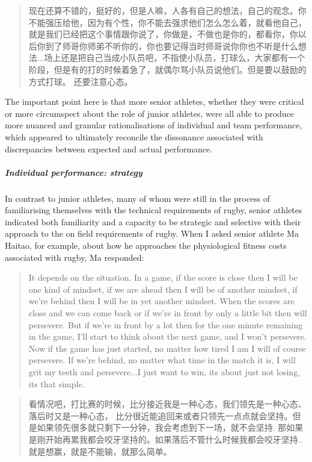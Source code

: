 \begin{CJK}{UTF8}{gbsn}
\begin{quotation}
  	现在还算不错的，挺好的，但是人嘛，人各有自己的想法，自己的观念。你不能强压给他，因为有个性，你不能去强求他们怎么怎么着，就看他自己，就是我们已经把这个事情跟你说了，你做是，不做也是你的，都看你，你以后你到了师哥你师弟不听你的，你也要记得当时师哥说你你也不听是什么想法...场上还是把自己当成小队员吧，不指使小队员，打球么，大家都有一个阶段，但是有的打的时候着急了，就偶尔骂小队员说他们。但是要以鼓励的方式打球。 还要注意心态。
\end{quotation}


The important point here is that more senior athletes, whether they were critical or more circumspect about the role of junior athletes, were all able to produce more nuanced and granular rationalisations of individual and team performance, which appeared to ultimately reconcile the dissonance associated with discrepancies between expected and actual performance.

\subparagraph{Individual performance: strategy}
In contrast to junior athletes, many of whom were still in the process of familiarising themselves with the technical requirements of rugby, senior athletes indicated both familiarity and a capacity to be strategic and selective with their approach to the on field requirements of rugby. When I asked senior athlete Ma Haitao, for example, about how he approaches the physiological fitness costs associated with rugby, Ma responded:

    \begin{quotation}
      It depends on the situation.  In a game, if the score is close then I will be one kind of mindset, if we are ahead then I will be of another mindset, if we're behind then I will be in yet another mindset.  When the scores are close and we can come back or if we're in front by only a little bit then will persevere.  But if we're in front by a lot then for the one minute remaining in the game, I'll start to think about the next game, and I won't persevere.  Now if the game has just started, no matter how tired I am I will of course persevere. If we're behind, no matter what time in the match it is, I will grit my teeth and persevere...I just want to win, its about just not losing, its that simple.
    \end{quotation}

    \begin{quotation}
      看情况吧，打比赛的时候，比分接近我是一种心态，我们领先是一种心态、落后时又是一种心态， 比分很近能追回来或者只领先一点点就会坚持。但是如果领先很多就只剩下一分钟，我会考虑到下一场，就不会坚持.  那如果是刚开始再累我都会咬牙坚持的。如果落后不管什么时候我都会咬牙坚持..就是想赢，就是不能输，就那么简单。
    \end{quotation}



\end{CJK}
